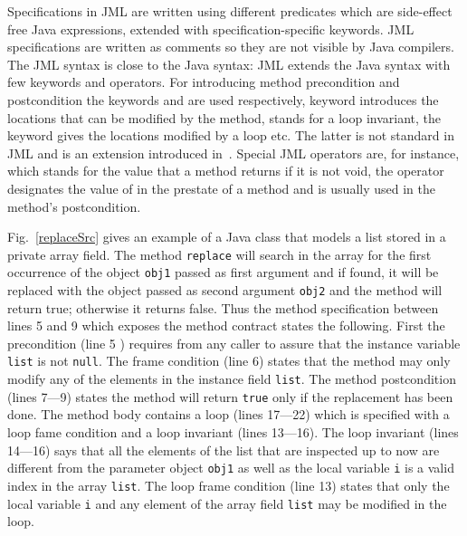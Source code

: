     Specifications in JML are written using different predicates
    which are side-effect free Java expressions, extended with
    specification-specific keywords. JML specifications are written as comments so they are not
    visible by Java compilers. The JML syntax is close to the Java syntax: JML extends the Java
    syntax with few keywords and operators. 
    For introducing method precondition and postcondition the keywords  and  are used  
    respectively,   keyword introduces the locations that can be modified by the method, 
     stands for a loop invariant, the  keyword gives the 
    locations modified by a loop etc. The latter is not standard in JML and is an extension introduced in~\cite{BRL-JACK}.
    Special JML operators are, for instance,  which stands for the value that a method returns if it is not
    void, the  operator 
    designates the value of  in the prestate of a method and is usually
    used in the method's postcondition.


     
Fig.~\ref{replaceSrc} gives an example of a Java class that models a list stored in a private array field. 
The method \texttt{replace} will search in the array for the first occurrence of the object \texttt{obj1} passed as first argument
 and if found, it will be replaced with the object passed as second argument \texttt{obj2} and the method will return true; otherwise it 
returns false. Thus the method  specification between lines 5 and 9 which exposes the method contract states the following.
First the precondition (line 5 ) requires from any caller to assure that the instance variable \texttt{list} is not \texttt{null}.
The frame condition (line  6) states that the method may only
modify any of the elements in the instance field \texttt{list}. The method postcondition (lines 7---9) states the method will return 
\texttt{true} only if  the replacement has been done.
The method body contains a loop (lines 17---22) which is specified with a loop fame condition and a loop invariant (lines 13---16).
  The loop invariant (lines 14---16) says that all the elements of the list that are inspected up to now are 
different from the parameter object \texttt{obj1} as well as the local variable \texttt{i}  is a valid index in the array \texttt{list}.
The loop frame condition (line 13)  states that only
 the local variable \texttt{i} and any element of the array field \texttt{list} may be modified in the loop.


